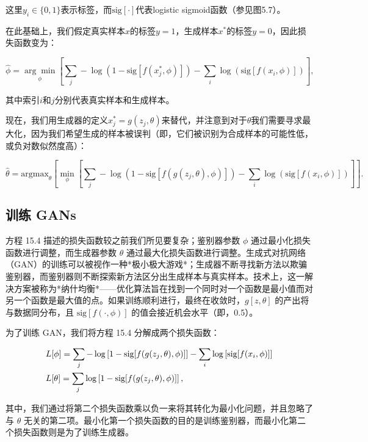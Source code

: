 \documentclass[lang=cn,newtx,10pt,scheme=chinese]{elegantbook}
\begin{document}
这里\(y_i \in \{0, 1\}\)表示标签，而\(\text{sig}[\cdot]\)代表logistic sigmoid函数（参见图5.7）。

在此基础上，我们假定真实样本\(x\)的标签\(y = 1\)，生成样本\(x^*\)的标签\(y = 0\)，因此损失函数变为：

\begin{equation}
\hat{\phi} = \underset{\phi}{\arg\min} \left[ \sum_j -\log \left( 1 - \text{sig}[f(x_j^*, \phi)] \right) - \sum_i \log \left( \text{sig}[f(x_i, \phi)] \right) \right], 
\end{equation}

其中索引\(i\)和\(j\)分别代表真实样本和生成样本。

现在，我们用生成器的定义\(x_j^* = g(z_j, \theta)\)来替代，并注意到对于\(\theta\)我们需要寻求最大化，因为我们希望生成的样本被误判（即，它们被识别为合成样本的可能性低，或负对数似然度高）：

\begin{equation}
\hat{\theta} = \text{argmax}_{\theta} \left[ \min_{\phi} \left[ \sum_j -\log \left(1 - \text{sig}[f(g(z_j, \theta), \phi)] \right) - \sum_i \log \left( \text{sig}[f(x_i, \phi)] \right) \right]  \right]. 
\end{equation}

\subsection{训练 GANs}
方程 15.4 描述的损失函数较之前我们所见要复杂；鉴别器参数 \(\phi\) 通过最小化损失函数进行调整，而生成器参数 \(\theta\) 通过最大化损失函数进行调整。生成式对抗网络（GAN）的训练可以被视作一种*极小极大游戏*；生成器不断寻找新方法以欺骗鉴别器，而鉴别器则不断探索新方法区分出生成样本与真实样本。技术上，这一解决方案被称为*纳什均衡*——优化算法旨在找到一个同时对一个函数是最小值而对另一个函数是最大值的点。如果训练顺利进行，最终在收敛时，\(g[z, \theta]\) 的产出将与数据同分布，且 \(\text{sig}[f(\cdot, \phi)]\) 的值会接近机会水平（即，0.5）。

为了训练 GAN，我们将方程 15.4 分解成两个损失函数：


\begin{align}
&L[\phi] = \sum_j -\log \left[ 1 - \text{sig}[f(g(z_j, \theta), \phi)] \right] - \sum_i \log \left[ \text{sig}[f(x_i, \phi)] \right] \notag \\
&L[\theta] = \sum_j \log \left[ 1 - \text{sig}[f(g(z_j, \theta), \phi)] \right], 
\end{align} 


其中，我们通过将第二个损失函数乘以负一来将其转化为最小化问题，并且忽略了与 \(\theta\) 无关的第二项。最小化第一个损失函数的目的是训练鉴别器，而最小化第二个损失函数则是为了训练生成器。
\end{document}

